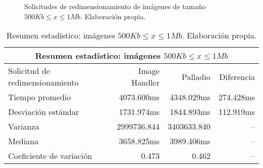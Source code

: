 \begin{figure}[h]
\hspace{-1cm}
\caption[Solicitudes de redimensionamiento de imágenes de tamaño $500Kb \leq x \leq 1Mb$]{Solicitudes de redimensionamiento de imágenes de tamaño $500Kb \leq x \leq 1Mb$. Elaboración propia.}
\label{fig:comparacion-imsimple-palladio-1mb}
\end{figure}

\begin{table}
    \centering
    \begin{tabular}{l|r|r|r}
        \toprule[1.5pt]
         \multicolumn{4}{c}{\textbf{Resumen estadístico: imágenes $500Kb \leq x \leq 1Mb$}} \\
        \midrule
        Solicitud de redimensionamiento  & Image Handler & Palladio & Diferencia\\  
        \midrule        
        Tiempo promedio  & 4073.600ms & 4348.029ms & 274.428ms\\
        Desviación estándar & 1731.974ms & 1844.893ms & 112.919ms\\
        Varianza & 2999736.844 & 3403633.840 & --\\
        Mediana & 3658.825ms & 3989.406ms & -- \\
        Coeficiente de variación & 0.473 & 0.462 & -- \\                      
        \bottomrule[1.5pt]
    \end{tabular}
    \caption[Resumen estadístico: imágenes $500Kb \leq x \leq 1Mb$]{Resumen estadístico: imágenes $500Kb \leq x \leq 1Mb$. Elaboración propia.}
    \label{table:datos-estadisticos-hasta-1mb}
\end{table}

